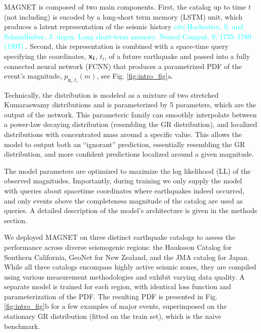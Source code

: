 \documentclass[pdflatex]{sn-jnl}
\newcommand{\neri}[1]{{\textcolor{cyan}{#1}}}
\begin{document}
MAGNET is composed of two main components. First, the catalog up to time $t$ (not including) is encoded by a long-short term memory (LSTM) unit, which produces a latent representation of the seismic history \neri{cite Hochreiter, S. and Schmidhuber, J. ürgen. Long short-term memory. Neural Comput. 9, 1735–1780 (1997).}.
Second, this representation is combined with a space-time query specifying the coordinates, $\bf{x}_i$, $t_i$, of a future earthquake and passed into a fully connected neural network (FCNN) that produces a parametrized PDF of the event's magnitude, $p_{\textbf{x}_i, t_i}(m)$, see Fig. \ref{fig:intro_fig}a. 

Technically, the distribution is modeled as a mixture of two stretched Kumaraswamy distributions \cite{kumaraswamy_generalized_1980} and is parameterized by 5 parameters, which are the output of the network. This parameteric family can  smoothly interpolate between a power-law decaying distribution (resembling the GR distribution), and localized distributions with concentrated mass around a specific value. This allows the model to output both an ``ignorant'' prediction, essentially resembling the GR distribution, and more confident predictions localized around a given magnitude.

The model parameters are optimized to maximize the log likelihood (LL) of the observed magnitudes. Importantly, during training we only supply the model with queries about spacetime coordinates where earthquakes indeed occurred, and only events above the completeness magnitude of the catalog are used as queries. A detailed description of the model's architecture is given in the methods section.


We deployed MAGNET on three distinct earthquake catalogs to assess the performance across diverse seismogenic regions: the Hauksson Catalog \cite{hauksson_waveform_2012} for Southern California, GeoNet \cite{gns_geonet_1970} for New Zealand, and the JMA catalog \cite{noauthor_japan_nodate-1} for Japan. While all three catalogs encompass highly active seismic zones, they are compiled using various measurement methodologies and exhibit varying data quality. A separate model is trained for each region, with identical loss function and parameterization of the PDF. The resulting PDF is presented in Fig. \ref{fig:intro_fig}b for a few examples of major events, superimposed on the stationary GR distribution (fitted on the train set), which is the naive benchmark.
\end{document}
